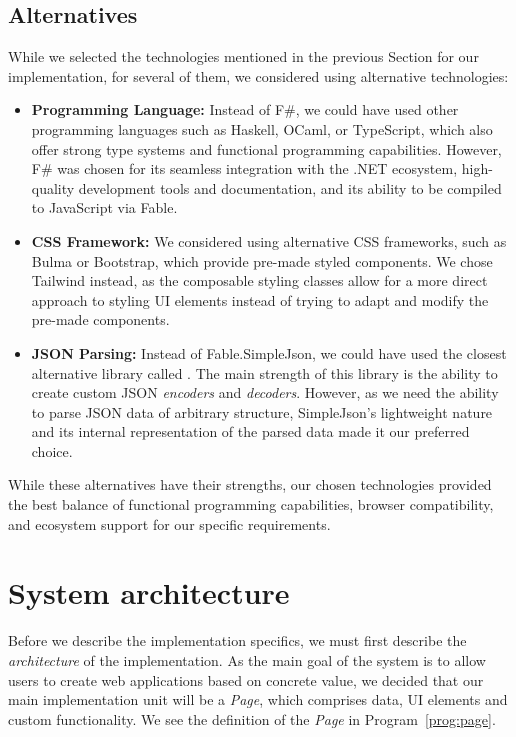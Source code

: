 \subsection{Alternatives}
While we selected the technologies mentioned in the previous Section for our implementation, for several of them, we considered using alternative technologies:
\begin{itemize}
	\item \textbf{Programming Language:} Instead of F\#, we could have used other programming languages such as Haskell, OCaml, or TypeScript, which also offer strong type systems and functional programming capabilities.
	      However, F\# was chosen for its seamless integration with the .NET ecosystem, high-quality development tools and documentation, and its ability to be compiled to JavaScript via Fable.
	\item \textbf{CSS Framework:} We considered using alternative CSS frameworks, such as Bulma or Bootstrap, which provide pre-made styled components.
	      We chose Tailwind instead, as the composable styling classes allow for a more direct approach to styling UI elements instead of trying to adapt and modify the pre-made components.
	\item \textbf{JSON Parsing:} Instead of Fable.SimpleJson, we could have used the closest alternative library called \citet{thoth}.
	      The main strength of this library is the ability to create custom JSON \emph{encoders} and \emph{decoders}.
	      However, as we need the ability to parse JSON data of arbitrary structure, SimpleJson's lightweight nature and its internal representation of the parsed data made it our preferred choice.
\end{itemize}
While these alternatives have their strengths, our chosen technologies provided the best balance of functional programming capabilities, browser compatibility, and ecosystem support for our specific requirements.

\section{System architecture}
\label{sec:appArch}
Before we describe the implementation specifics, we must first describe the \emph{architecture} of the implementation.
As the main goal of the system is to allow users to create web applications based on concrete value, we decided that our main implementation unit will be a \emph{Page}, which comprises data, UI elements and custom functionality.
We see the definition of the \emph{Page} in Program~\ref{prog:page}.

